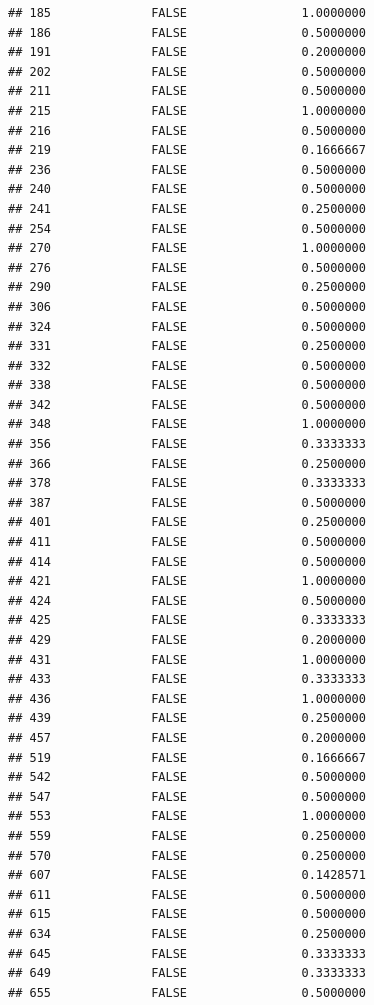 \documentclass[
]{article}
\begin{document}
\begin{verbatim}
## 185              FALSE                1.0000000
## 186              FALSE                0.5000000
## 191              FALSE                0.2000000
## 202              FALSE                0.5000000
## 211              FALSE                0.5000000
## 215              FALSE                1.0000000
## 216              FALSE                0.5000000
## 219              FALSE                0.1666667
## 236              FALSE                0.5000000
## 240              FALSE                0.5000000
## 241              FALSE                0.2500000
## 254              FALSE                0.5000000
## 270              FALSE                1.0000000
## 276              FALSE                0.5000000
## 290              FALSE                0.2500000
## 306              FALSE                0.5000000
## 324              FALSE                0.5000000
## 331              FALSE                0.2500000
## 332              FALSE                0.5000000
## 338              FALSE                0.5000000
## 342              FALSE                0.5000000
## 348              FALSE                1.0000000
## 356              FALSE                0.3333333
## 366              FALSE                0.2500000
## 378              FALSE                0.3333333
## 387              FALSE                0.5000000
## 401              FALSE                0.2500000
## 411              FALSE                0.5000000
## 414              FALSE                0.5000000
## 421              FALSE                1.0000000
## 424              FALSE                0.5000000
## 425              FALSE                0.3333333
## 429              FALSE                0.2000000
## 431              FALSE                1.0000000
## 433              FALSE                0.3333333
## 436              FALSE                1.0000000
## 439              FALSE                0.2500000
## 457              FALSE                0.2000000
## 519              FALSE                0.1666667
## 542              FALSE                0.5000000
## 547              FALSE                0.5000000
## 553              FALSE                1.0000000
## 559              FALSE                0.2500000
## 570              FALSE                0.2500000
## 607              FALSE                0.1428571
## 611              FALSE                0.5000000
## 615              FALSE                0.5000000
## 634              FALSE                0.2500000
## 645              FALSE                0.3333333
## 649              FALSE                0.3333333
## 655              FALSE                0.5000000

\end{verbatim}
\end{document}
